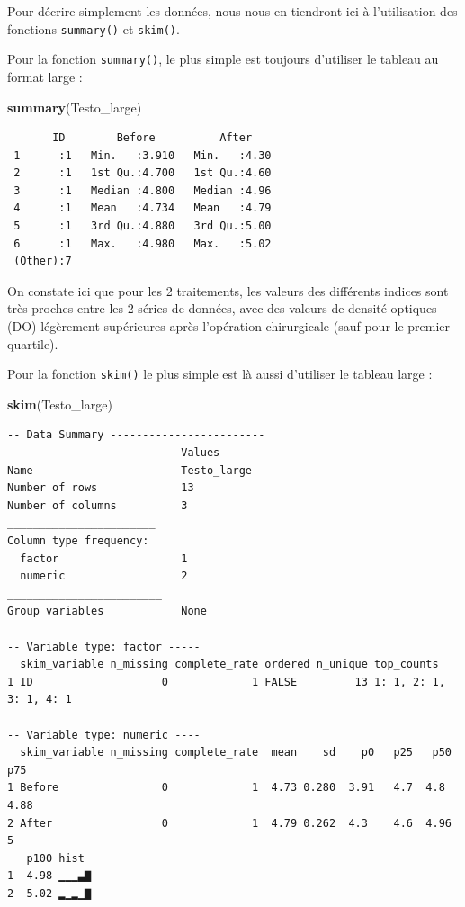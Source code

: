 \documentclass[a4paperpaper,]{article}
\newenvironment{Shaded}{\begin{snugshade}}{\end{snugshade}}
\newcommand{\KeywordTok}[1]{\textcolor[rgb]{0.12,0.11,0.11}{\textbf{#1}}}
\newcommand{\NormalTok}[1]{\textcolor[rgb]{0.12,0.11,0.11}{#1}}
\begin{document}
Pour décrire simplement les données, nous nous en tiendront ici à l'utilisation des fonctions \texttt{summary()} et \texttt{skim()}.

Pour la fonction \texttt{summary()}, le plus simple est toujours d'utiliser le tableau au format large :

\begin{Shaded}
\begin{Highlighting}[]
\KeywordTok{summary}\NormalTok{(Testo_large)}
\end{Highlighting}
\end{Shaded}

\begin{verbatim}
       ID        Before          After     
 1      :1   Min.   :3.910   Min.   :4.30  
 2      :1   1st Qu.:4.700   1st Qu.:4.60  
 3      :1   Median :4.800   Median :4.96  
 4      :1   Mean   :4.734   Mean   :4.79  
 5      :1   3rd Qu.:4.880   3rd Qu.:5.00  
 6      :1   Max.   :4.980   Max.   :5.02  
 (Other):7                                 
\end{verbatim}

On constate ici que pour les 2 traitements, les valeurs des différents indices sont très proches entre les 2 séries de données, avec des valeurs de densité optiques (DO) légèrement supérieures après l'opération chirurgicale (sauf pour le premier quartile).

Pour la fonction \texttt{skim()} le plus simple est là aussi d'utiliser le tableau large :

\begin{Shaded}
\begin{Highlighting}[]
\KeywordTok{skim}\NormalTok{(Testo_large)}
\end{Highlighting}
\end{Shaded}

\begin{verbatim}
-- Data Summary ------------------------
                           Values     
Name                       Testo_large
Number of rows             13         
Number of columns          3          
_______________________               
Column type frequency:                
  factor                   1          
  numeric                  2          
________________________              
Group variables            None       

-- Variable type: factor -----
  skim_variable n_missing complete_rate ordered n_unique top_counts            
1 ID                    0             1 FALSE         13 1: 1, 2: 1, 3: 1, 4: 1

-- Variable type: numeric ----
  skim_variable n_missing complete_rate  mean    sd    p0   p25   p50   p75
1 Before                0             1  4.73 0.280  3.91   4.7  4.8   4.88
2 After                 0             1  4.79 0.262  4.3    4.6  4.96  5   
   p100 hist 
1  4.98 ▁▁▁▃▇
2  5.02 ▂▁▂▁▇
\end{verbatim}
\end{document}
